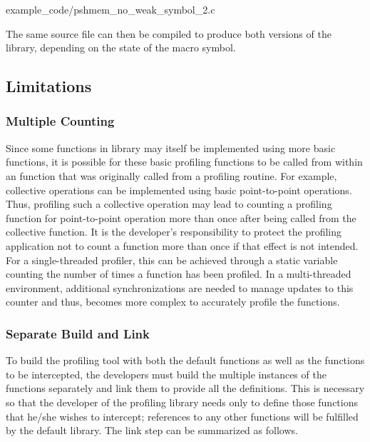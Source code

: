 
      {example_code/pshmem_no_weak_symbol_2.c}

The same source file can then be compiled to produce both versions 
of the library, depending on the state of the 
 macro symbol.

\subsection{Limitations}
\label{sec:pshmem_limitations}

\subsubsection{Multiple Counting}
\label{sec:pshmem_multiple_count}
Since some functions in \openshmem library may itself be implemented 
using more basic \openshmem functions, it is possible for these basic  
profiling functions to be called from within an \openshmem function 
that was originally called from a profiling routine. For example, 
\openshmem collective operations can be implemented using basic 
point-to-point operations. Thus, profiling such a collective 
operation may lead to counting a profiling function for 
point-to-point operation more than once after being called from the 
collective function. It is the developer's responsibility to protect 
the profiling application not to count a function more than once if 
that effect is not intended. For a single-threaded profiler, this 
can be achieved through a static variable counting the number of 
times a function has been profiled. In a multi-threaded environment, 
additional synchronizations are needed to manage updates to this 
counter and thus, becomes more complex to accurately profile the 
\openshmem functions.

\subsubsection{Separate Build and Link}
\label{sec:pshmem_separate_build_link}
To build the profiling tool with both the default \openshmem
functions as well as the \openshmem functions to be intercepted, 
the developers must build the multiple instances of the \openshmem
functions separately and link them to provide all the definitions. 
This is necessary so that the developer of the profiling library 
needs only to define those \openshmem functions that he/she wishes 
to intercept; references to any other functions will be fulfilled 
by the default \openshmem library. The link step can be summarized 
as follows. \\

